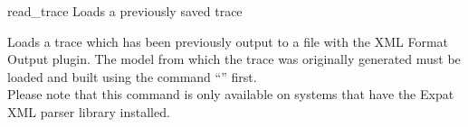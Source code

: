 \begin{nusmvCommand} {read\_trace} {Loads a previously saved trace}


\begin{cmdOpt}

\end{cmdOpt}

Loads a trace which has been previously output to a file with the XML
Format Output plugin. The model from which the trace was originally
generated must be loaded and built using the command ``''
first.\\Please note that this command is only available on systems
that have the Expat XML parser library installed.
\end{nusmvCommand}
